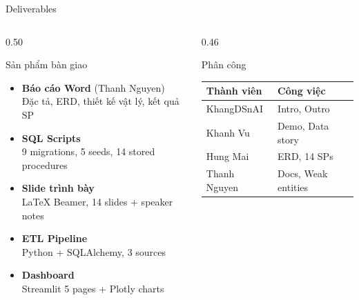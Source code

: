 \begin{frame}{Deliverables}
    \begin{columns}[T]
        \begin{column}{0.50\textwidth}
            \begin{block}{Sản phẩm bàn giao}
                \begin{itemize}\small
                    \item \textbf{Báo cáo Word} {\scriptsize (Thanh Nguyen)} \\
                          {\scriptsize Đặc tả, ERD, thiết kế vật lý, kết quả SP}
                    \item \textbf{SQL Scripts} \\
                          {\scriptsize 9 migrations, 5 seeds, 14 stored procedures}
                    \item \textbf{Slide trình bày} \\
                          {\scriptsize LaTeX Beamer, 14 slides + speaker notes}
                    \item \textbf{ETL Pipeline} \\
                          {\scriptsize Python + SQLAlchemy, 3 sources}
                    \item \textbf{Dashboard} \\
                          {\scriptsize Streamlit 5 pages + Plotly charts}
                \end{itemize}
            \end{block}
        \end{column}
        \begin{column}{0.46\textwidth}
            \begin{exampleblock}{Phân công}
                \begin{tabular}{@{}ll@{}}
                    \toprule
                    \textbf{Thành viên} & \textbf{Công việc} \\
                    \midrule
                    KhangDSnAI    & Intro, Outro        \\
                    Khanh Vu      & Demo, Data story    \\
                    Hung Mai      & ERD, 14 SPs         \\
                    Thanh Nguyen  & Docs, Weak entities \\
                    \bottomrule
                \end{tabular}
            \end{exampleblock}


\end{column}
\end{columns}
\end{frame}
